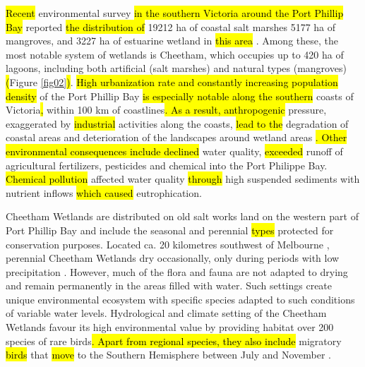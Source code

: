 \documentclass[jmse,article,submit,pdftex,moreauthors]{Definitions/mdpi}
\begin{document}
\hl{Recent} environmental survey \hl{in the southern Victoria around the Port Phillip Bay }reported \hl{the distribution of }19212 ha of coastal salt marshes 5177 ha of mangroves, and 3227 ha of estuarine wetland in \hl{this area} \cite{Boon}. Among these, the most notable system of wetlands is Cheetham, which occupies up to 420 ha of lagoons, including both artificial (salt marshes) and natural types (mangroves) \hl{(}Figure \ref{fig02}\hl{)}. \hl{High urbanization rate and constantly increasing population density} of the Port Phillip Bay \hl{is especially notable along the southern} coasts of Victoria\hl{, }within 100 km of coastlines\hl{. As a result, anthropogenic} pressure, exaggerated by \hl{industrial} activities along the coasts, \hl{lead to the} degradation of coastal areas and deterioration of the landscapes around wetland areas \cite{land11020311}\hl{. Other environmental consequences include declined} water quality, \hl{exceeded} runoff of agricultural fertilizers, pesticides and chemical into the Port Philippe Bay. \hl{Chemical pollution }affected water quality \hl{through} high suspended sediments with nutrient inflows \hl{which caused} eutrophication. 

Cheetham Wetlands are distributed on old salt works land on the western part of Port Phillip Bay and include the seasonal and perennial \hl{types} protected for conservation purposes. Located ca. 20 kilometres southwest of Melbourne \cite{Westonetal2006}, perennial Cheetham Wetlands dry occasionally, only during periods with low precipitation \cite{jmse9080898}. However, much of the flora and fauna are not adapted to drying and remain permanently in the areas filled with water. Such settings create unique environmental ecosystem\hl{ }with specific species adapted to such conditions of variable water levels. Hydrological and climate setting of the Cheetham Wetlands favour its high environmental value by providing habitat over 200 species of rare birds\hl{. Apart from regional species, they also include} migratory \hl{birds} that \hl{move} to the Southern Hemisphere between July and November \cite{Jackson}. 
\end{document}
